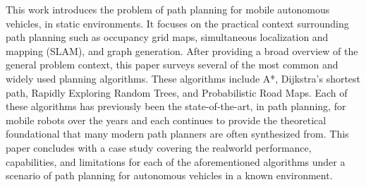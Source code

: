 This work introduces the problem of path planning for mobile autonomous vehicles, in static environments. It focuses on the practical context surrounding path planning such as occupancy grid maps, simultaneous localization and mapping (SLAM), and graph generation. After providing a broad overview of the general problem context, this paper surveys several of the most common and widely used planning algorithms. These algorithms include A*, Dijkstra's shortest path, Rapidly Exploring Random Trees, and Probabilistic Road Maps. Each of these algorithms has previously been the state-of-the-art, in path planning, for mobile robots over the years and each continues to provide the theoretical foundational that many modern path planners are often synthesized from. This paper concludes with a case study covering the realworld performance, capabilities, and limitations for each of the aforementioned algorithms under a scenario of path planning for autonomous vehicles in a known environment.